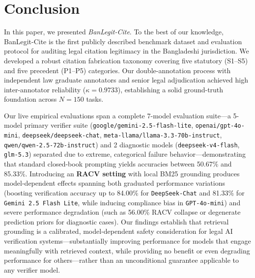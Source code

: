 \documentclass[conference]{IEEEtran}
\begin{document}
\section{Conclusion}
In this paper, we presented \textit{BanLegit-Cite}. To the best of our knowledge, BanLegit-Cite is the first publicly described benchmark dataset and evaluation protocol for auditing legal citation legitimacy in the Bangladeshi jurisdiction. We developed a robust citation fabrication taxonomy covering five statutory (S1--S5) and five precedent (P1--P5) categories. Our double-annotation process with independent law graduate annotators and senior legal adjudication achieved high inter-annotator reliability ($\kappa = 0.9733$), establishing a solid ground-truth foundation across $N=150$ tasks.

Our live empirical evaluations span a complete 7-model evaluation suite—a 5-model primary verifier suite (\texttt{google/gemini-2.5-flash-lite}, \texttt{openai/gpt-4o-mini}, \texttt{deepseek/deepseek-chat}, \texttt{meta-llama/llama-3.3-70b-instruct}, \texttt{qwen/qwen-2.5-72b-instruct}) and 2 diagnostic models (\texttt{deepseek-v4-flash}, \texttt{glm-5.3}) separated due to extreme, categorical failure behavior—demonstrating that standard closed-book prompting yields accuracies between 50.67\% and 85.33\%. Introducing an \textbf{RACV setting} with local BM25 grounding produces model-dependent effects spanning both graduated performance variations (boosting verification accuracy up to 84.00\% for \texttt{DeepSeek-Chat} and 81.33\% for \texttt{Gemini 2.5 Flash Lite}, while inducing compliance bias in \texttt{GPT-4o-mini}) and severe performance degradation (such as 56.00\% RACV collapse or degenerate prediction priors for diagnostic cases). Our findings establish that retrieval grounding is a calibrated, model-dependent safety consideration for legal AI verification systems—substantially improving performance for models that engage meaningfully with retrieved context, while providing no benefit or even degrading performance for others—rather than an unconditional guarantee applicable to any verifier model.

\end{document}
